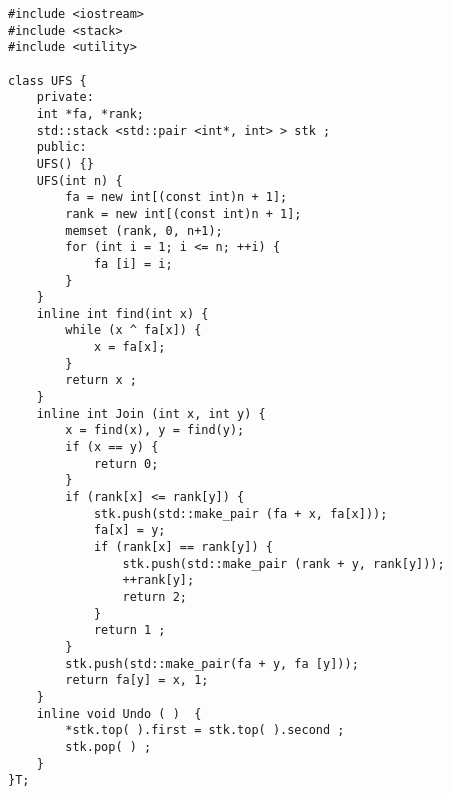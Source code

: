 \begin{lstlisting}
#include <iostream>
#include <stack>
#include <utility>

class UFS {
	private:
	int *fa, *rank;
	std::stack <std::pair <int*, int> > stk ;    
	public:
	UFS() {}
	UFS(int n) {
		fa = new int[(const int)n + 1];
		rank = new int[(const int)n + 1];
		memset (rank, 0, n+1);   
		for (int i = 1; i <= n; ++i) {
			fa [i] = i;
		}
	}
	inline int find(int x) {
		while (x ^ fa[x]) {
			x = fa[x];
		}
		return x ;
	}
	inline int Join (int x, int y) {
		x = find(x), y = find(y);
		if (x == y) {
			return 0;
		}
		if (rank[x] <= rank[y]) {
			stk.push(std::make_pair (fa + x, fa[x]));
			fa[x] = y;
			if (rank[x] == rank[y]) {
				stk.push(std::make_pair (rank + y, rank[y]));
				++rank[y];
				return 2;
			}
			return 1 ;
		}
		stk.push(std::make_pair(fa + y, fa [y]));
		return fa[y] = x, 1;
	}
	inline void Undo ( )  {
		*stk.top( ).first = stk.top( ).second ;
		stk.pop( ) ;
	}
}T;
\end{lstlisting}